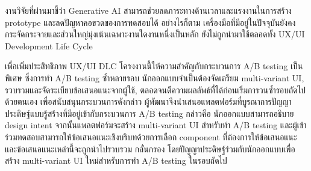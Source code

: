 \documentclass[a4paper,oneside]{cpe-thesis-th}
\newcommand{\thaijustify}[1]{%
  \par\hspace{30pt}\justifying
  #1
}
\begin{document}
\thaijustify{
  งานวิจัยที่ผ่านมาชี้ว่า Generative AI สามารถช่วยลดภาระทางด้านเวลาและแรงงานในการสร้าง prototype และลดปัญหาคอขวดของการทดสอบได้ อย่างไรก็ตาม เครื่องมือที่มีอยู่ในปัจจุบันยังคงกระจัดกระจายและส่วนใหญ่มุ่งเน้นเฉพาะงานใดงานหนึ่งเป็นหลัก ยังไม่ถูกนำมาใช้ตลอดทั้ง UX/UI Development Life Cycle \cite{chung2025ureka, lu2022bridging}
}


\thaijustify{
  เพื่อเพิ่มประสิทธิภาพ UX/UI DLC โครงงานนี้ให้ความสำคัญกับกระบวนการ A/B testing เป็นพิเศษ ซึ่งการทำ A/B testing ซ้ำหลายรอบ นักออกแบบจำเป็นต้องจัดเตรียม multi-variant UI, รวบรวมและจัดระเบียบข้อเสนอแนะจากผู้ใช้, ตลอดจนตีความผลลัพธ์ที่ได้ก่อนเริ่มการวนซ้ำรอบถัดไปด้วยตนเอง เพื่อสนับสนุนกระบวนการดังกล่าว ผู้พัฒนาจึงนำเสนอแพลตฟอร์มที่บูรณาการปัญญาประดิษฐ์แบบรู้สร้างที่มีอยู่เข้ากับกระบวนการ A/B testing กล่าวคือ นักออกแบบสามารถอธิบาย design intent จากนั้นแพลตฟอร์มจะสร้าง multi-variant UI สำหรับทำ A/B testing และผู้เข้าร่วมทดสอบสามารถให้ข้อเสนอแนะเชิงบริบทด้วยการเลือก component ที่ต้องการให้ข้อเสนอแนะ และข้อเสนอแนะเหล่านี้จะถูกนำไปรวบรวม กลั่นกรอง โดยปัญญาประดิษฐ์ร่วมกับนักออกแบบเพื่อสร้าง multi-variant UI ใหม่สำหรับการทำ A/B testing ในรอบถัดไป}
\end{document}
